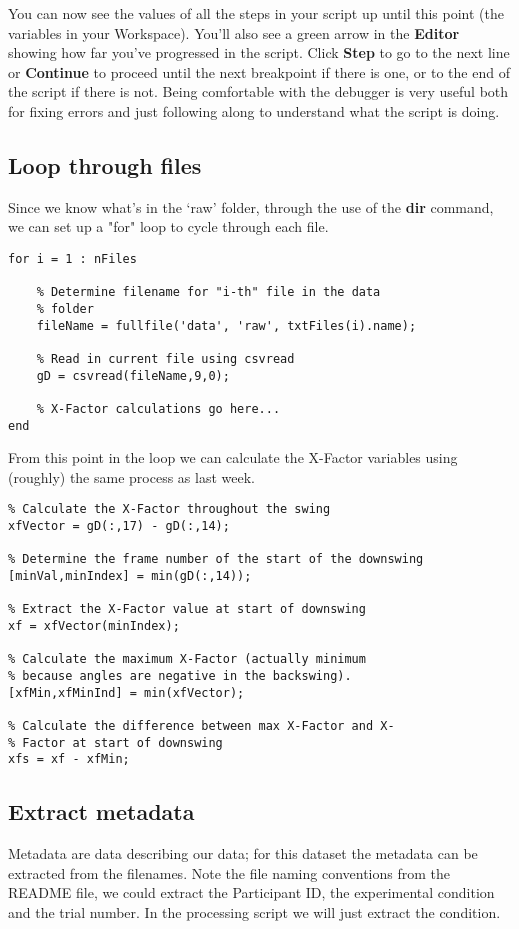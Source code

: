 \documentclass[12pt,a4paper]{article}
\begin{document}
You can now see the values of all the steps in your script up until this point (the variables in your Workspace).
You'll also see a green arrow in the \textbf{Editor} showing how far you've progressed in the script.
Click \textbf{Step} to go to the next line or \textbf{Continue} to proceed  until the next breakpoint if there is one, or to the end of the script if there is not.
Being comfortable with the debugger is very useful both for fixing errors and just following along to understand what the script is doing.

\subsection{Loop through files}
Since we know what's in the `raw' folder, through the use of the \textbf{dir} command, we can set up a "for" loop to cycle through each file.

\begin{lstlisting}[style=Matlab-editor]
%% Loop through each file in the data folder
for i = 1 : nFiles
	
    % Determine filename for "i-th" file in the data 
    % folder
    fileName = fullfile('data', 'raw', txtFiles(i).name);
    
    % Read in current file using csvread
    gD = csvread(fileName,9,0);
	
    % X-Factor calculations go here...
end
\end{lstlisting}

From this point in the loop we can calculate the X-Factor variables using (roughly) the same process as last week.

\begin{lstlisting}[style=Matlab-editor]
%% Calculate dependent variables
% Calculate the X-Factor throughout the swing
xfVector = gD(:,17) - gD(:,14);
    
% Determine the frame number of the start of the downswing 
[minVal,minIndex] = min(gD(:,14));
    
% Extract the X-Factor value at start of downswing
xf = xfVector(minIndex);
    
% Calculate the maximum X-Factor (actually minimum
% because angles are negative in the backswing).
[xfMin,xfMinInd] = min(xfVector);
    
% Calculate the difference between max X-Factor and X-
% Factor at start of downswing
xfs = xf - xfMin;
\end{lstlisting}

\subsection{Extract metadata}
Metadata are data describing our data; for this dataset the metadata can be extracted from the filenames.
Note the file naming conventions from the README file, we could extract the Participant ID, the experimental condition and the trial number.
In the processing script we will just extract the condition.
\end{document}

